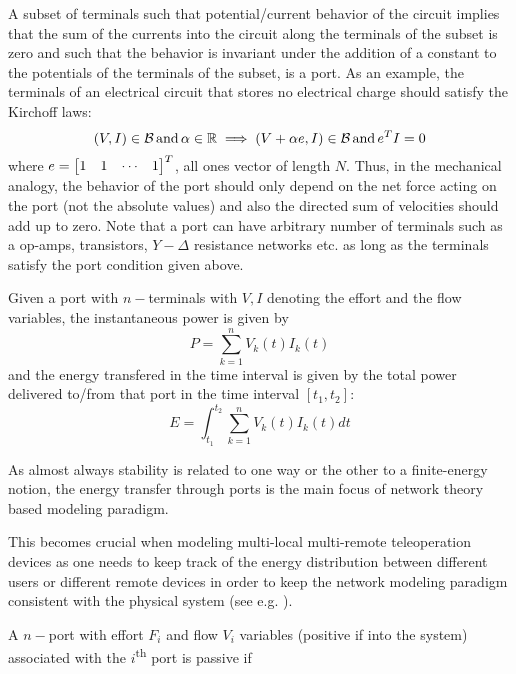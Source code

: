 A subset of terminals such that potential/current behavior of the circuit implies that the sum of the currents into the 
circuit along the terminals of the subset is zero and such that the behavior is invariant under the addition of a constant 
to the potentials of the terminals of the subset, is a port. As an example, the terminals of an electrical circuit that stores no electrical 
charge should satisfy the Kirchoff laws: 
\[
(V,I) \in \mathcal{B}\,\text{and}\, \alpha\in\mathbb{R} \implies (V+\alpha e,I) \in \mathcal{B}\,\text{and}\, e^T I = 0
\]
where $e=\begin{bmatrix}1&1&\cdots&1\end{bmatrix}^T$, all ones vector of length $N$. Thus, in the mechanical analogy, the behavior of the 
port should only depend on the net force acting on the port (not the absolute values) and also the directed sum of 
velocities should add up to zero. Note that a port can have arbitrary number of terminals such as a op-amps, transistors, 
$Y-\Delta$ resistance networks etc. as long as the terminals satisfy the port condition given above. 

Given a port with $n-$terminals with $V,I$ denoting the effort and the flow variables, the instantaneous power is given by 
\[
P = \sum_{k=1}^n{V_k(t)I_k(t)}
\]
and the energy transfered in the time interval is given by the total power delivered
to/from that port in the time interval $[t_1,t_2]$: 
\[
E = \int^{t_{2}}_{t_{1}}\sum_{k=1}^n{V_k(t)I_k(t)}dt
\]

As almost always stability is related to one way or the other to a finite-energy notion, the energy transfer through ports
is the main focus of network theory based modeling paradigm.

This becomes crucial when modeling multi-local multi-remote teleoperation devices
as one needs to keep track of the energy distribution between different users or different remote devices in order to 
keep the network modeling paradigm consistent with the physical system (see e.g. \cite{panzirsch}).

A $n-$port with effort $F_i$ and flow $V_i$ variables (positive if into the system) associated 
with the $i$\textsuperscript{th} port is passive if 

